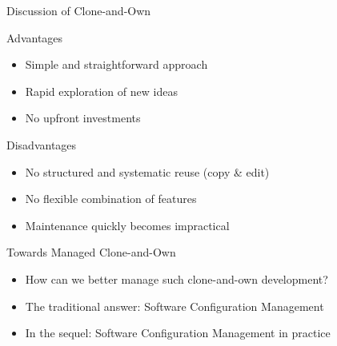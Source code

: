 \begin{frame}{Discussion of Clone-and-Own}
	\hfill
	\hfill
	\hfill
	\hfill

	\begin{mycolumns}[columns=2,widths={45,55},animation=none]
		\begin{note}{Advantages}
			\begin{itemize}
				\item Simple and straightforward approach
				\item Rapid exploration of new ideas
				\item No upfront investments
			\end{itemize}
		\end{note}
	\mynextcolumn
		\begin{note}{Disadvantages}
			\begin{itemize}
				\item No structured and systematic reuse (copy \& edit)
				\item No flexible combination of features
				\item Maintenance quickly becomes impractical
			\end{itemize}
		\end{note}
	\end{mycolumns}	
	\begin{mycolumns}[columns=3,widths={15,70}]
	\mynextcolumn
		\begin{note}{Towards Managed Clone-and-Own}
			\begin{itemize}
				\item How can we better manage such clone-and-own development?
				\item The traditional answer: Software Configuration Management
				\item In the sequel: Software Configuration Management in practice
			\end{itemize}
		\end{note}
	\mynextcolumn
	\end{mycolumns}
\end{frame}

